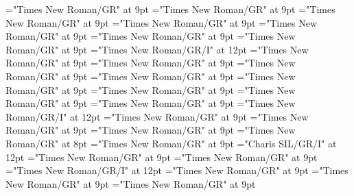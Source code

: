\documentclass[gps1,twoside]{article}
\begin{document}
\font\spanspanpartofspeechmorphosyntaxanalysissharedgrammaticalinfosensesentrybefore="Times New Roman/GR" at 9pt
\font\spanpartofspeechmorphosyntaxanalysissharedgrammaticalinfosensesentrylastchildafter="Times New Roman/GR" at 9pt
\font\spanspanslotsmorphosyntaxanalysissharedgrammaticalinfosensesentrybefore="Times New Roman/GR" at 9pt
\font\slotsmorphosyntaxanalysissharedgrammaticalinfosensesentrybefore="Times New Roman/GR" at 9pt
\font\spanspannameslotslotsmorphosyntaxanalysissharedgrammaticalinfosensesentrybefore="Times New Roman/GR" at 9pt
\font\spannameslotslotsmorphosyntaxanalysissharedgrammaticalinfosensesentrylastchildafter="Times New Roman/GR" at 9pt
\font\morphosyntaxanalysissensesensesentryafter="Times New Roman/GR" at 9pt
\font\morphosyntaxanalysissensesensesentry="Times New Roman/GR/I" at 12pt
\font\spanspanpartofspeechmorphosyntaxanalysissensesensesentrybefore="Times New Roman/GR" at 9pt
\font\spanpartofspeechmorphosyntaxanalysissensesensesentrylastchildafter="Times New Roman/GR" at 9pt
\font\spanspanslotsmorphosyntaxanalysissensesensesentrybefore="Times New Roman/GR" at 9pt
\font\slotsmorphosyntaxanalysissensesensesentrybefore="Times New Roman/GR" at 9pt
\font\spanspannameslotslotsmorphosyntaxanalysissensesensesentrybefore="Times New Roman/GR" at 9pt
\font\spannameslotslotsmorphosyntaxanalysissensesensesentrylastchildafter="Times New Roman/GR" at 9pt
\font\sensetypesensesensesentrybefore="Times New Roman/GR" at 9pt
\font\sensetypesensesensesentryafter="Times New Roman/GR" at 9pt
\font\sensetypesensesensesentry="Times New Roman/GR/I" at 12pt
\font\spanspanabbreviationsensetypesensesensesentrybefore="Times New Roman/GR" at 9pt
\font\spanspandefinitionorglosssensesensesentrybefore="Times New Roman/GR" at 9pt
\font\spandefinitionorglosssensesensesentrylastchildafter="Times New Roman/GR" at 9pt
\font\exampleexampleexamplessensesensesentrybefore="Times New Roman/GR" at 8pt
\font\examplessensesensesentryafter="Times New Roman/GR" at 9pt
\font\spanbzhexampleexampleexamplessensesensesentry="Charis SIL/GR/I" at 12pt
\font\spanspanexampleexampleexamplessensesensesentrybefore="Times New Roman/GR" at 9pt
\font\spanexampleexampleexamplessensesensesentrylastchildafter="Times New Roman/GR" at 9pt
\font\spanexampleexampleexamplessensesensesentry="Times New Roman/GR/I" at 12pt
\font\spanspantranslationtranslationtranslationsexampleexamplessensesensesentrybefore="Times New Roman/GR" at 9pt
\font\spantranslationtranslationtranslationsexampleexamplessensesensesentrylastchildafter="Times New Roman/GR" at 9pt
\font\spanspanencyclopedicinfosensesensesentrybefore="Times New Roman/GR" at 9pt
\end{document}
